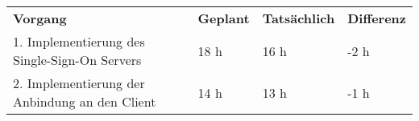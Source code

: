 \begin{tabular}{llll}
\rowcolor{heading}\textbf{Vorgang} & \textbf{Geplant} & \textbf{Tatsächlich} & \textbf{Differenz} \\
1. Implementierung des Single-Sign-On Servers & 18 h   & 16 h   & -2 h   \\
\rowcolor{odd}2. Implementierung der Anbindung an den Client & 14 h   & 13 h   & -1 h  \\
\end{tabular}
